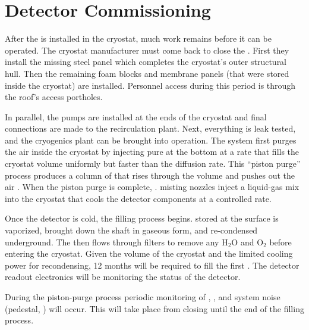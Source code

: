 \section{Detector Commissioning}
\label{sec:fdsp-tc-commiss}


After the  is installed in the cryostat, much work remains before it can be operated. 
The cryostat manufacturer must come back to close the . 
First they install the missing steel panel which completes the cryostat's outer structural hull. 
Then the remaining foam blocks and membrane panels (that were stored inside the cryostat) are installed. 
Personnel access during this period is through the roof's access portholes. 

In parallel,  the \lar pumps are installed at the ends of the cryostat and final connections are made to the recirculation plant. Next, everything is leak tested, and the cryogenics plant can be brought into operation. The system first purges the air inside the cryostat  by injecting pure  at the bottom  at a rate that fills the cryostat volume uniformly but faster than the diffusion rate. This ``piston purge'' process produces a column of   that rises through the volume and pushes out the air .  When the piston purge is complete, . misting nozzles inject a liquid-gas mix into the cryostat that cools the detector components at a controlled rate. 


Once the detector is cold, the filling process begins.  stored at the surface  %
is vaporized, brought down the shaft in gaseous form, and re-condensed underground. The \lar then flows through filters to remove any H$_2$O and O$_2$ before entering the cryostat. Given the volume of the cryostat and the limited cooling power for recondensing, \num{12} months will be required to fill the first . The detector readout electronics will be  monitoring the status of the detector. 

During the piston-purge process periodic monitoring of , , and  system noise (pedestal, ) will occur. %
This will take place from  closing until the end of the filling process. 

